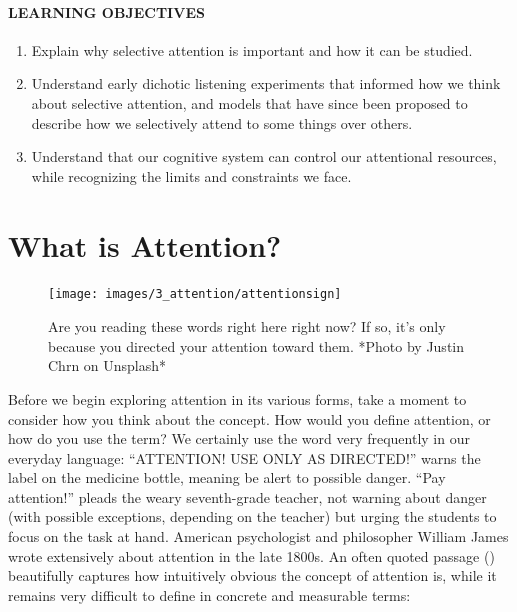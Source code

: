 \documentclass[
]{krantz}
\providecommand{\tightlist}{%
  \setlength{\itemsep}{0pt}\setlength{\parskip}{0pt}}
\begin{document}
\paragraph*{LEARNING OBJECTIVES}\label{learning-objectives-2}

\begin{enumerate}
\def\labelenumi{\arabic{enumi}.}
\tightlist
\item
  Explain why selective attention is important and how it can be studied.
\item
  Understand early dichotic listening experiments that informed how we think about selective attention, and models that have since been proposed to describe how we selectively attend to some things over others.
\item
  Understand that our cognitive system can control our attentional resources, while recognizing the limits and constraints we face.
\end{enumerate}

\section{What is Attention?}\label{what-is-attention}

\begin{figure}

{\centering \texttt{[image: images/3\_attention/attentionsign]} 

}

\caption{Are you reading these words right here right now? If so, it’s only because you directed your attention toward them. *Photo by Justin Chrn on Unsplash*}\label{fig:attentionsign}
\end{figure}

Before we begin exploring attention in its various forms, take a moment to consider how you think about the concept. How would you define attention, or how do you use the term? We certainly use the word very frequently in our everyday language: ``ATTENTION! USE ONLY AS DIRECTED!'' warns the label on the medicine bottle, meaning be alert to possible danger. ``Pay attention!'' pleads the weary seventh-grade teacher, not warning about danger (with possible exceptions, depending on the teacher) but urging the students to focus on the task at hand. American psychologist and philosopher William James wrote extensively about attention in the late 1800s. An often quoted passage () beautifully captures how intuitively obvious the concept of attention is, while it remains very difficult to define in concrete and measurable terms:
\end{document}
